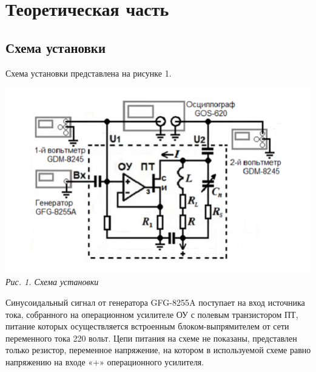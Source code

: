 

\newcommand{\formula}[3]
{
    \noindent#1\\[0.1cm]
    \begin{equation}\label{#2}
        #3
    \end{equation}
}

\newcommand{\mth}[1]
{
    \begin{math}
        #1
    \end{math}
}

\newcommand{\ruB}[1]
{
    _{\text{#1}}
}

\section{Теоретическая часть}
\subsection{Схема установки}

Схема установки представлена на рисунке 1.

\begin{center}

    \includegraphics[scale=0.9]{323-scheme.png} \\
    \textit{Рис. 1. Схема установки}

\end{center}

Синусоидальный сигнал от генератора GFG-8255A поступает на вход источника тока, собранного на операционном усилителе ОУ с полевым транзистором ПТ, питание которых осуществляется встроенным блоком-выпрямителем от сети переменного тока 220 вольт. Цепи питания на схеме не показаны, представлен только резистор, переменное напряжение, на котором в используемой схеме равно напряжению на входе «+» операционного усилителя.

